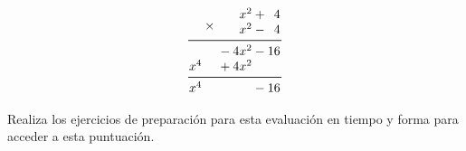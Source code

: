 \documentclass[11pt,addpoints]{exam}
\begin{document}
\begin{questions}
\begin{parts}
        \begin{minipage}[c]{0.8\linewidth}
            \begin{solutionbox}{6cm}
                \begin{minipage}[c]{0.5\linewidth}
                    \[ \begin{array}{*{12}{@{}>{{}}r<{{}}@{}}}
                                                                   &  &  &     &  & \multirow{2.5}{*}{$ {}\times{} $} &   & x^2  &  & + & 4  & \\
                                                                   &  &  &     &  &                                   &   & x^2  &  & - & 4  & \\
                            \cmidrule[0.6pt](l{-1pt}r{-1pt}){1-12}
                                                                   &  &  &     &  &                                   & - & 4x^2 &  & - & 16 & \\
                                                                   &  &  & x^4 &  &                                   & + & 4x^2 &  &   &    & \\
                            \cmidrule[0.6pt](l{-1pt}r{-1pt}){1-12} &  &  & x^4 &  &                                   &   &      &  & - & 16 &
                        \end{array}
                    \]
                \end{minipage}
            \end{solutionbox}
        \end{minipage}
    \end{parts}

    \question[20] Realiza los ejercicios de preparaci\'on para esta evaluaci\'on en tiempo y forma para acceder a esta puntuaci\'on.
\end{questions}
\end{document}

